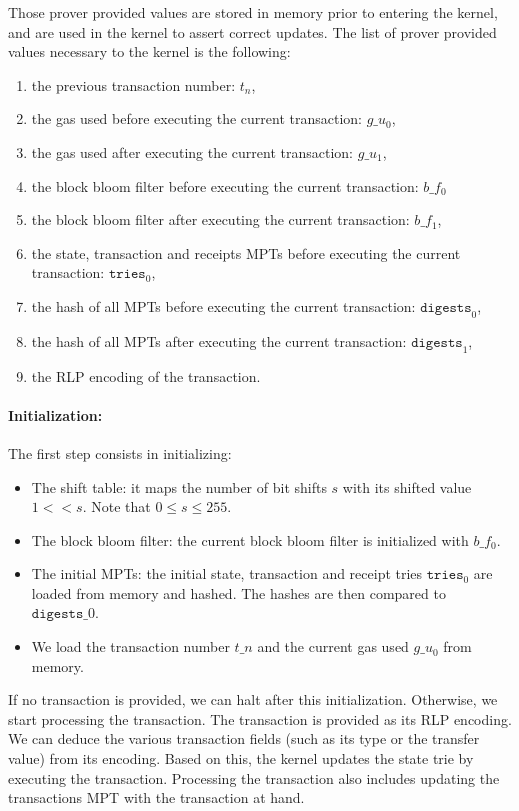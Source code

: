 Those prover provided values are stored in memory prior to entering the kernel, and are used in the kernel to assert correct updates. The list of prover provided values necessary to the kernel is the following:
\begin{enumerate}
    \item the previous transaction number: $t_n$,
    \item the gas used before executing the current transaction: $g\_u_0$,
    \item the gas used after executing the current transaction: $g\_u_1$,
    \item the block bloom filter before executing the current transaction: $b\_f_0$
    \item the block bloom filter after executing the current transaction: $b\_f_1$,
    \item the state, transaction and receipts MPTs before executing the current transaction: $\texttt{tries}_0$,
    \item the hash of all MPTs before executing the current transaction: $\texttt{digests}_0$,
    \item the hash of all MPTs after executing the current transaction: $\texttt{digests}_1$,
    \item the RLP encoding of the transaction.
\end{enumerate}

\paragraph*{Initialization:} The first step consists in initializing:
\begin{itemize}
    \item The shift table: it maps the number of bit shifts $s$ with its shifted value $1 << s$. Note that $0 \leq s \leq 255$.
    \item The block bloom filter: the current block bloom filter is initialized with $b\_f_0$.
    \item The initial MPTs: the initial state, transaction and receipt tries $\texttt{tries}_0$ are loaded from memory and hashed. The hashes are then compared to $\texttt{digests}\_0$.
    \item We load the transaction number $t\_n$ and the current gas used $g\_u_0$ from memory.
\end{itemize}

If no transaction is provided, we can halt after this initialization. Otherwise, we start processing the transaction. The transaction is provided as its RLP encoding. We can deduce the various transaction fields (such as its type or the transfer value) from its encoding. Based on this, the kernel updates the state trie by executing the transaction. Processing the transaction also includes updating the transactions MPT with the transaction at hand.

